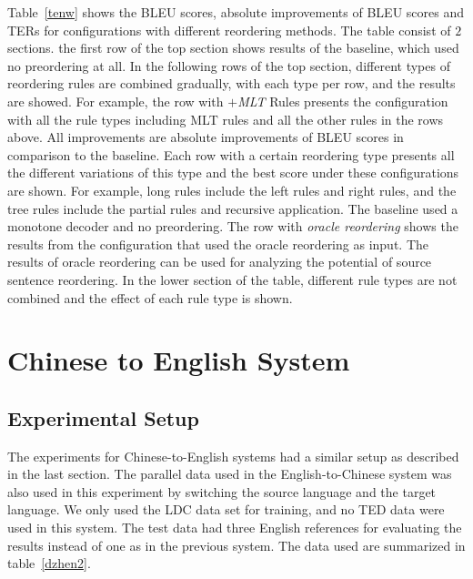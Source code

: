 Table~\ref{tenw} shows the \ac{BLEU} scores, absolute improvements of \ac{BLEU} scores and \ac{TER}s for configurations with different reordering methods. The table consist of $2$ sections. the first row of the top section shows results of the baseline, which used no preordering at all. In the following rows of the top section, different types of reordering rules are combined gradually, with each type per row, and the results are showed. For example, the row with \emph{$+$MLT} Rules presents the configuration with all the rule types including \ac{MLT} rules and all the other rules in the rows above. All improvements are absolute improvements of \ac{BLEU} scores in comparison to the baseline. Each row with a certain reordering type presents all the different variations of this type and the best score under these configurations are shown. For example, long rules include the left rules and right rules, and the tree rules include the partial rules and recursive application. The baseline used a monotone decoder and no preordering. The row with \emph{oracle reordering} shows the results from the configuration that used the oracle reordering as input. The results of oracle reordering can be used for analyzing the potential of source sentence reordering. In the lower section of the table, different rule types are not combined and the effect of each rule type is shown. %



\section{Chinese to English System}
\label{ch:Evaluation:sec:zhen2}


\subsection{Experimental Setup}

The experiments for Chinese-to-English systems had a similar setup as described in the last section. The parallel data used in the English-to-Chinese system was also used in this experiment by switching the source language and the target language. We only used the \acs{LDC} data set for training, and no \acs{TED} data were used in this system. The test data had three English references for evaluating the results instead of one as in the previous system. The data used are summarized in table~\ref{dzhen2}.


